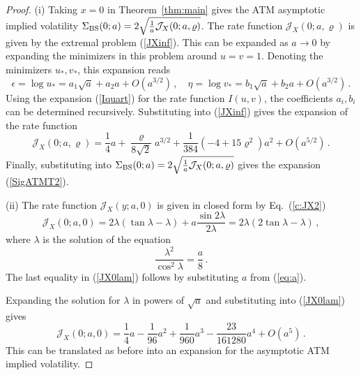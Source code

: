 \documentclass[11pt]{article}
\numberwithin{equation}{section}
\theoremstyle{plain}
\begin{document}
\begin{proof}
(i) Taking $x=0$ in Theorem~\ref{thm:main} gives the ATM asymptotic implied
volatility $\Sigma_{\rm BS}(0;a) = 2\sqrt{\frac{1}{a} \mathcal{J}_X(0;a,\varrho)}$.
The rate function $\mathcal{J}_X(0;a,\varrho)$ is given by the extremal problem
(\ref{JXinf}). This can be expanded as $a\to 0$ by expanding the minimizers
in this problem around $u=v=1$. Denoting the minimizers $u_*,v_*$, this
expansion reads
\begin{equation}
\epsilon= \log u_*  = a_1 \sqrt{a} + a_2 a + O(a^{3/2})\,,\quad
\eta = \log v_*  = b_1 \sqrt{a} + b_2 a + O(a^{3/2})\,.
\end{equation}
Using the expansion (\ref{Iquart}) for the rate function $I(u,v)$,
the coefficients $a_i,b_i$ can be determined recursively. Substituting
into (\ref{JXinf}) gives the expansion of the rate function 
\begin{equation}
\mathcal{J}_X(0;a,\varrho)  =\frac14 a + \frac{\varrho}{8\sqrt2} a^{3/2}
+ \frac{1}{384} (-4+15\varrho^2) a^2 + O(a^{5/2})\,.
\end{equation}
Finally, substituting into 
$\Sigma_{\rm BS}(0;a) = 2\sqrt{\frac{1}{a} \mathcal{J}_X(0;a,\varrho)}$
gives the expansion (\ref{SigATMT2}).

(ii) The rate function $\mathcal{J}_X(y;a,0)$ is given in closed form 
by Eq.~(\ref{c:JX2})
\begin{equation}\label{JX0lam}
\mathcal{J}_X(0;a,0) = 2\lambda(\tan\lambda - \lambda) 
+ a \frac{\sin 2\lambda}{2\lambda} = 
2\lambda(2\tan\lambda  -\lambda)\,,
\end{equation}
where $\lambda$ is the solution of the equation
\begin{equation}\label{eq:a}
\frac{\lambda^2}{\cos^2\lambda} = \frac{a}{8}\,.
\end{equation}
The last equality in (\ref{JX0lam}) follows by substituting $a$ from 
(\ref{eq:a}).

Expanding the solution for $\lambda$ in powers of $\sqrt{a}$ and substituting
into (\ref{JX0lam}) gives
\begin{equation}
\mathcal{J}_X(0;a,0) =\frac14 a - \frac{1}{96} a^2 + \frac{1}{960} a^3 - 
\frac{23}{161280} a^4 + O(a^5)\,.
\end{equation}
This can be translated as before into an expansion for the asymptotic ATM
implied volatility.

\end{proof}
\end{document}
